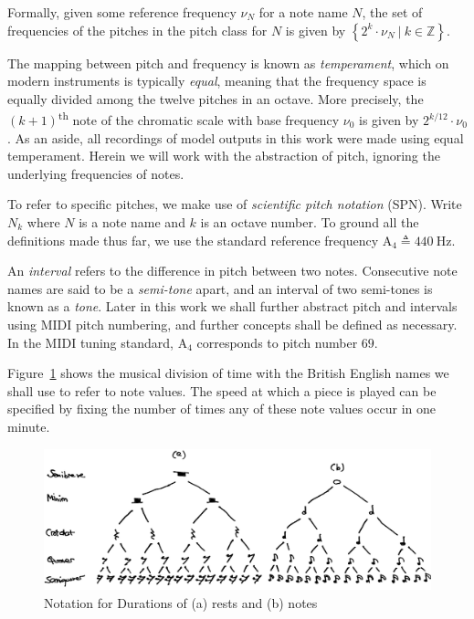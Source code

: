 \documentclass[12pt,a4paper,twoside,openright]{report}
\newcommand{\set}[1]{ \left\{ #1 \right\} }
\begin{document}
Formally, given some reference frequency $\nu_N$ for a note name $N$, the set of
frequencies of the pitches in the pitch class for $N$ is given by $\set{ 2^k
\cdot \nu_N\ |\ k \in \mathbb{Z} }.$

The mapping between pitch and frequency is known as \emph{temperament}, which on
modern instruments is typically \emph{equal}, meaning that the frequency space is
equally divided among the twelve pitches in an octave. More precisely, the
$(k+1)$\textsuperscript{th} note of the chromatic scale with base frequency $\nu_0$ is
given by $2^{k/12}\cdot\nu_0$. As an aside, all recordings of
model outputs in this work were made using equal temperament. Herein
we will work with the abstraction of pitch, ignoring the underlying frequencies
of notes.

To refer to specific pitches, we make use of \emph{scientific pitch notation}
(SPN). Write $N_k$ where $N$ is a note name and $k$ is an octave number. To
ground all the definitions made thus far, we use the standard reference
frequency $\mathrm{A}_4 \triangleq 440\ \mathrm{Hz}$.

An \emph{interval} refers to the difference in pitch between two notes.
Consecutive note names are said to be a \emph{semi-tone} apart, and an interval
of two semi-tones is known as a \emph{tone}. Later in this work we shall further
abstract pitch and intervals using MIDI pitch numbering, and further concepts
shall be defined as necessary. In the MIDI tuning standard, $\mathrm{A}_4$
corresponds to pitch number $69$.

Figure~\ref{fig:note-values} shows the musical division of time with the British
English names we shall use to refer to note values. The speed at which a piece
is played can be specified by fixing the number of times any of these note
values occur in one minute.

\begin{figure}[H]
\centering
\includegraphics[width=400pt]{figs/note_values_tmp.jpg}
\caption{Notation for Durations of (a) rests and (b) notes}
\label{fig:note-values}
\end{figure}
\end{document}
